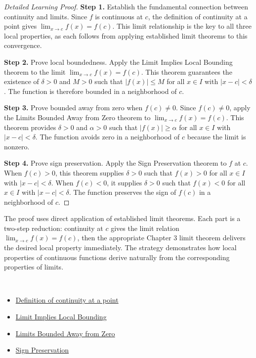 \begin{proof}[Detailed Learning Proof]
\LRAProofBodyStart

\textbf{Step 1.} Establish the fundamental connection between continuity and limits. Since $f$ is continuous at $c$, the definition of continuity at a point gives $\lim_{x \to c} f(x) = f(c)$. This limit relationship is the key to all three local properties, as each follows from applying established limit theorems to this convergence.

\textbf{Step 2.} Prove local boundedness. Apply the Limit Implies Local Bounding theorem to the limit $\lim_{x \to c} f(x) = f(c)$. This theorem guarantees the existence of $\delta > 0$ and $M > 0$ such that $|f(x)| \leq M$ for all $x \in I$ with $|x - c| < \delta$. The function is therefore bounded in a neighborhood of $c$.

\textbf{Step 3.} Prove bounded away from zero when $f(c) \neq 0$. Since $f(c) \neq 0$, apply the Limits Bounded Away from Zero theorem to $\lim_{x \to c} f(x) = f(c)$. This theorem provides $\delta > 0$ and $\alpha > 0$ such that $|f(x)| \geq \alpha$ for all $x \in I$ with $|x - c| < \delta$. The function avoids zero in a neighborhood of $c$ because the limit is nonzero.

\textbf{Step 4.} Prove sign preservation. Apply the Sign Preservation theorem to $f$ at $c$. When $f(c) > 0$, this theorem supplies $\delta > 0$ such that $f(x) > 0$ for all $x \in I$ with $|x - c| < \delta$. When $f(c) < 0$, it supplies $\delta > 0$ such that $f(x) < 0$ for all $x \in I$ with $|x - c| < \delta$. The function preserves the sign of $f(c)$ in a neighborhood of $c$.
\end{proof}

\begin{remark*}
The proof uses direct application of established limit theorems. Each part is a two-step reduction: continuity at $c$ gives the limit relation $\lim_{x \to c} f(x) = f(c)$, then the appropriate Chapter 3 limit theorem delivers the desired local property immediately. The strategy demonstrates how local properties of continuous functions derive naturally from the corresponding properties of limits.
\end{remark*}

\begin{remark*}[Dependencies]~\\
\begin{itemize}
  \item \hyperref[def:continuous-at-point]{Definition of continuity at a point}
  \item \hyperref[thm:limit-implies-local-bounding]{Limit Implies Local Bounding}
  \item \hyperref[thm:limit-quotient]{Limits Bounded Away from Zero}
  \item \hyperref[prop:sign-preservation]{Sign Preservation}
\end{itemize}
\end{remark*}
